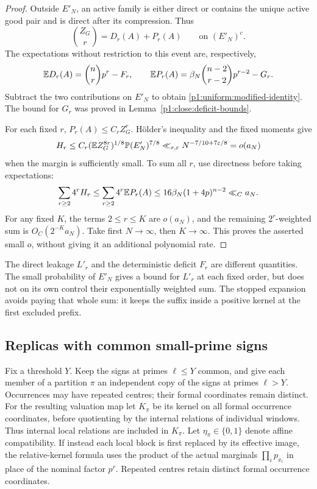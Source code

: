 \begin{proof}
Outside \(E'_N\), an active family is either direct
or contains the unique active good pair and is
direct after its compression. Thus
\[
 \binom{Z_G}{r}=D_r(A)+P_r(A)
              \qquad\text{on }(E'_N)^c.
\]
The expectations without restriction to this event
are, respectively,
\[
 \mathbb E D_r(A)=\binom nrp^r-F_r,\qquad
 \mathbb E P_r(A)
     =\beta_N\binom{n-2}{r-2}p^{r-2}-G_r.
\]
Subtract the two contributions on \(E'_N\) to
obtain \eqref{p1:uniform:modified-identity}.
The bound for \(G_r\) was proved in
Lemma~\ref{p1:close:deficit-bounds}.

For each fixed \(r\), \(P_r(A)\le C_rZ_G^r\).
H\"older's inequality and the fixed moments give
\[
 H_r\le C_r(\mathbb E Z_G^{8r})^{1/8}
                  \mathbb P(E'_N)^{7/8}
       \ll_{r,\varepsilon}N^{-7/10+7\varepsilon/8}
       =o(a_N)
\]
when the margin is sufficiently small.
To sum all \(r\), use directness before taking
expectations:
\[
 \sum_{r\ge2}4^rH_r
 \le\sum_{r\ge2}4^r\mathbb E P_r(A)
 \le16\beta_N(1+4p)^{n-2}
       \ll_C a_N.
\]
For any fixed \(K\), the terms \(2\le r\le K\)
are \(o(a_N)\), and the remaining \(2^r\)-weighted
sum is \(O_C(2^{-K}a_N)\).
Take first \(N\to\infty\), then \(K\to\infty\).
This proves the asserted small \(o\), without
giving it an additional polynomial rate.
\end{proof}

The direct leakage \(L'_r\) and the deterministic
deficit \(F_r\) are different quantities.
The small probability of \(E'_N\) gives a bound
for \(L'_r\) at each fixed order, but does not
on its own control their exponentially weighted
sum. The stopped expansion avoids paying that
whole sum: it keeps the suffix inside a
positive kernel at the first excluded prefix.

\subsection{Replicas with common small-prime signs}

Fix a threshold \(Y\). Keep the signs at primes
\(\ell\le Y\) common, and give each member of a
partition \(\pi\) an independent copy of the signs
at primes \(\ell>Y\). Occurrences may have repeated
centres; their formal coordinates remain distinct.
For the resulting valuation map let \(K_\pi\)
be its kernel on all formal occurrence coordinates, before quotienting
by the internal relations of individual windows. Thus internal local
relations are included in \(K_\pi\). Let
\(\eta_\pi\in\{0,1\}\) denote affine compatibility.
If instead each local block is first replaced by its effective image,
the relative-kernel formula uses the product of the actual marginals
\(\prod_i p_{x_i}\) in place of the nominal factor \(p^r\).
Repeated centres retain distinct formal occurrence coordinates.

